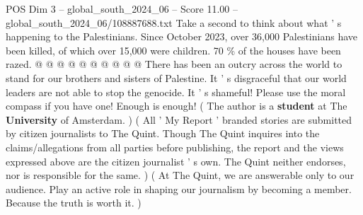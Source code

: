 \begin{textsample}{POS Dim 3 – global\_south\_2024\_06 – Score 11.00 – global\_south\_2024\_06/108887688.txt}
Take a second to think about what ' s happening to the Palestinians.
Since October 2023, over 36,000 Palestinians have been killed, of which over 15,000 were children. 70 \% of the houses have been razed. @ @ @ @ @ @ @ @ @ @ There has been an outcry across the world to stand for our brothers and sisters of Palestine.
It ' s disgraceful that our world leaders are not able to stop the genocide.
It ' s shameful!
Please use the moral compass if you have one!
Enough is enough! ( The author is a \textbf{student} at The \textbf{University} of Amsterdam. ) ( All ' My Report ' branded stories are submitted by citizen journalists to The Quint.
Though The Quint inquires into the claims/allegations from all parties before publishing, the report and the views expressed above are the citizen journalist ' s own.
The Quint neither endorses, nor is responsible for the same. ) ( At The Quint, we are answerable only to our audience.
Play an active role in shaping our journalism by becoming a member.
Because the truth is worth it. )

\end{textsample}
